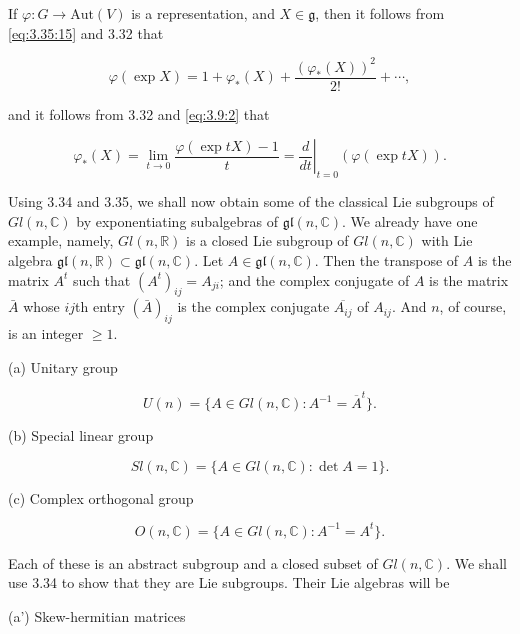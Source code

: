 \begin{remarks}\label{thm:3.36}
If $\varphi: G \to \mathrm{Aut}(V)$ is a representation, and $X \in \mathfrak{g}$, then it follows from \eqref{eq:3.35:15} and 3.32 that

\begin{equation}
\tag{1}\label{eq:3.36:1}
\varphi(\exp X)=1+\varphi_{*}(X)+\frac{(\varphi_{*}(X))^{2}}{2!}+\cdots,
\end{equation}

and it follows from 3.32 and \eqref{eq:3.9:2} that

\begin{equation}
\tag{2}\label{eq:3.36:2}
\varphi_{*}(X)=\lim_{t\to0}\frac{\varphi(\exp tX)-1}{t}=\left.\frac{d}{dt}\right|_{t=0}(\varphi(\exp tX)).
\end{equation}

\end{remarks}
\label{thm:3.37}
Using 3.34 and 3.35, we shall now obtain some of the classical Lie subgroups of $Gl(n,\mathbb{C})$ by exponentiating subalgebras of $\mathfrak{gl}(n,\mathbb{C})$. We already have one example, namely, $Gl(n,\mathbb{R})$ is a closed Lie subgroup of $Gl(n,\mathbb{C})$ with Lie algebra $\mathfrak{gl}(n,\mathbb{R}) \subset \mathfrak{gl}(n,\mathbb{C})$. Let $A \in \mathfrak{gl}(n,\mathbb{C})$. Then the transpose of $A$ is the matrix $A^t$ such that $(A^t)_{ij} = A_{ji}$; and the complex conjugate of $A$ is the matrix $\bar{A}$ whose $ij$th entry $(\bar{A})_{ij}$ is the complex conjugate $\overline{A_{ij}}$ of $A_{ij}$. And $n$, of course, is an integer $\geq 1$.

(a) Unitary group 

\[
U(n)=\{A\in Gl(n,\mathbb{C})\colon A^{-1}=\overline{A}^{t}\}.
\]

(b) Special linear group 

\[
Sl(n,\mathbb{C})=\{A\in Gl(n,\mathbb{C})\colon\det A=1\}.
\]

(c) Complex orthogonal group 

\[
O(n,\mathbb{C})=\{A\in Gl(n,\mathbb{C})\colon A^{-1}=A^{t}\}.
\]

Each of these is an abstract subgroup and a closed subset of $Gl(n,\mathbb{C})$. We shall use 3.34 to show that they are Lie subgroups. Their Lie algebras will be

(a') Skew-hermitian matrices 

